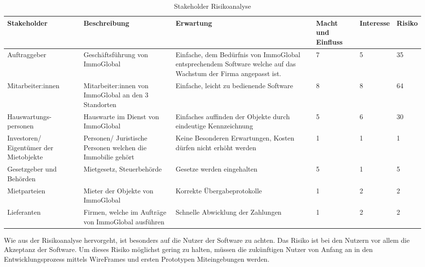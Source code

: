 \begin{table}[h]
  \centering
  \settowidth{}
  \setlength\extrarowheight{2pt}
  \begin{tabulary}{1.0\textwidth}{|L|L|L|L|L|L|}
    \hline
    \textbf{Stakeholder} & 
    \textbf{Beschreibung} & 
    \textbf{Erwartung}& 
    \textbf{Macht und Einfluss} & 
    \textbf{Interesse} & 
    \textbf{Risiko}\\
    \hline
    Auftraggeber & 
    Geschäftsführung von ImmoGlobal& 
    Einfache, dem Bedürfnis von ImmoGlobal entsprechendem Software welche auf das Wachstum der Firma angepasst ist. &
    7 &
    5 & 
    35\\ 
    \hline
    Mitarbeiter:innen & 
    Mitarbeiter:innen von ImmoGlobal an den 3 Standorten & 
    Einfache, leicht zu bedienende Software&
    8 &
    8 &
    64\\
    \hline
    Hauswartungs-personen & 
    Hauswarte im Dienst von ImmoGlobal &
    Einfaches auffinden der Objekte durch eindeutige Kennzeichnung &
    5 &
    6 &
    30 \\
    \hline
    Investoren/ Eigentümer der Mietobjekte & 
    Personen/ Juristische Personen welchen die Immobilie gehört &
    Keine Besonderen Erwartungen, Kosten dürfen nicht erhöht werden &
    1 &
    1 &
    1 \\
    \hline
    Gesetzgeber und Behörden &
    Mietgesetz, Steuerbehörde &
    Gesetze werden eingehalten &
    5 &
    1 &
    5 \\
    \hline
    Mietparteien & 
    Mieter der Objekte von ImmoGlobal &
    Korrekte Übergabeprotokolle &
    1 &
    2 &
    2 \\
    \hline
    Lieferanten & 
    Firmen, welche im Aufträge von ImmoGlobal ausführen &
    Schnelle Abwicklung der Zahlungen &
    1 &
    2 &
    2 \\
    \hline
  \end{tabulary}
  \caption{Stakeholder Risikoanalyse}
  \label{tblRisikonalyse}
\end{table}

Wie aus der Risikoanalyse hervorgeht, ist besonders auf die Nutzer der Software zu achten. Das Risiko ist bei den Nutzern vor allem die Akzeptanz der Software. Um dieses Risiko möglichst gering zu halten, müssen die zukünftigen Nutzer von Anfang an in den Entwicklungsprozess mittels WireFrames und ersten Prototypen Miteingebungen werden. 
